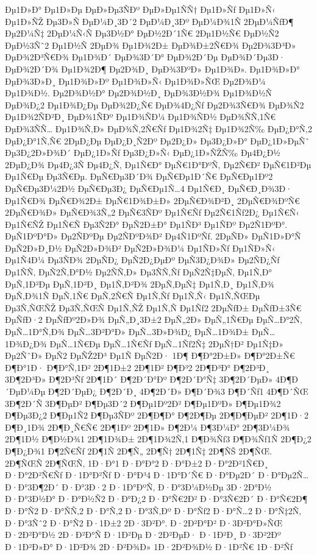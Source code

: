 {Ðµ1Ð»Ð°
Ðµ1Ð»Ðµ
ÐµÐ»Ðµ3ÑÐº
ÐµÐ»Ðµ1ÑÑ†
Ðµ1Ð»Ñƒ
Ðµ1Ð»Ñ‹
Ðµ1Ð»ÑŽ
Ðµ3Ð»Ñ
ÐµÐ¼Ð¸3Ð´2
ÐµÐ¼Ð¸3Ðº
ÐµÐ¼Ð¾1Ñ
2ÐµÐ¼ÑƒÐ¶
Ðµ2Ð¼Ñ‡
2ÐµÐ¼Ñ‹Ñ
Ðµ3Ð½Ð°
ÐµÐ½2Ð´1Ñ€
2Ðµ1Ð½Ñ€
ÐµÐ½Ñ2
ÐµÐ½3Ñˆ2
Ðµ1Ð½Ñ
2ÐµÐ¾
Ðµ1Ð¾2Ð±
ÐµÐ¾Ð±2Ñ€Ð¾
Ðµ2Ð¾3Ð³Ð»
ÐµÐ¾2Ð³Ñ€Ð¾
Ðµ1Ð¾Ð´
ÐµÐ¾3Ð´Ð°
ÐµÐ¾2Ð´Ðµ
ÐµÐ¾Ð´Ðµ3Ð·
ÐµÐ¾2Ð´Ð¾
Ðµ1Ð¾2Ð¶
Ðµ2Ð¾Ð¸
ÐµÐ¾3ÐºÐ»
Ðµ1Ð¾Ð».
Ðµ1Ð¾Ð»Ð°
ÐµÐ¾3Ð»Ð¸
Ðµ1Ð¾Ð»Ðº
Ðµ1Ð¾Ð»Ñ‹
Ðµ1Ð¾Ð»ÑŒ
Ðµ2Ð¾Ð¼
Ðµ1Ð¾Ð½.
Ðµ2Ð¾Ð½Ð°
Ðµ2Ð¾Ð½Ð¸
ÐµÐ¾3Ð½Ð¾
Ðµ1Ð¾Ð½Ñ
ÐµÐ¾Ð¿2
Ðµ1Ð¾Ð¿Ðµ
ÐµÐ¾2Ð¿Ñ€
ÐµÐ¾4Ð¿Ñƒ
Ðµ2Ð¾3Ñ€Ð¾
ÐµÐ¾Ñ2
Ðµ1Ð¾2ÑÐ²Ð¸
ÐµÐ¾1ÑÐº
Ðµ1Ð¾ÑÐ¼
Ðµ1Ð¾ÑÐ½
ÐµÐ¾ÑÑ‚1Ñ€
ÐµÐ¾3ÑÑ…
Ðµ1Ð¾Ñ‚Ð»
ÐµÐ¾Ñ‚2Ñ€Ñƒ
Ðµ1Ð¾2Ñ‡
Ðµ1Ð¾2Ñ‰
ÐµÐ¿Ð°Ñ‚2
ÐµÐ¿Ð°1Ñ‚Ñ€
2ÐµÐ¿Ðµ
ÐµÐ¿Ð¸Ñ2Ðº
Ðµ2Ð¿Ð»
Ðµ3Ð¿Ð»Ð°
ÐµÐ¿1Ð»ÐµÑˆ
Ðµ3Ð¿2Ð»Ð¾Ð´
ÐµÐ¿1Ð»Ñƒ
Ðµ3Ð¿Ð»Ñ‹
ÐµÐ¿1Ð»ÑŽÑ‰
Ðµ4Ð¿Ð½
2ÐµÐ¿Ð¾
Ðµ4Ð¿3Ñ
Ðµ4Ð¿Ñ‚
Ðµ1Ñ€Ð°
ÐµÑ€1Ð°ÐºÑ‚
Ðµ2Ñ€Ð²
ÐµÑ€1Ð²Ðµ
Ðµ1Ñ€Ðµ
Ðµ3Ñ€Ðµ.
ÐµÑ€Ðµ3Ð´Ð¾
ÐµÑ€Ðµ1Ð´Ñ€
ÐµÑ€Ðµ1Ðº2
ÐµÑ€Ðµ3Ð¼2Ð½
ÐµÑ€Ðµ3Ð¿
ÐµÑ€Ðµ1Ñ…4
Ðµ1Ñ€Ð¸
ÐµÑ€Ð¸Ð¾3Ð·
Ðµ1Ñ€Ð¾
ÐµÑ€Ð¾2Ð±
ÐµÑ€1Ð¾Ð±Ð»
2ÐµÑ€Ð¾Ð²Ð¸
2ÐµÑ€Ð¾ÐºÑ€
2ÐµÑ€Ð¾Ð»
ÐµÑ€Ð¾3Ñ„2
ÐµÑ€3ÑÐº
Ðµ1Ñ€Ñƒ
Ðµ2Ñ€1Ñƒ2Ð¿
Ðµ1Ñ€Ñ‹
Ðµ1Ñ€ÑŽ
Ðµ1Ñ€Ñ
Ðµ3Ñ2Ð°
ÐµÑ2Ð±Ð°
Ðµ1ÑÐ³
Ðµ1ÑÐº
Ðµ2Ñ1ÐºÐ°.
ÐµÑ1ÐºÐ°Ð»
Ðµ2ÑÐºÐµ
Ðµ2ÑÐºÐ¾Ð²
Ðµ4Ñ1ÐºÑƒ.
2ÐµÑÐ»
ÐµÑ1Ð»Ð°Ñ
ÐµÑ2Ð»Ð¸Ð½
ÐµÑ2Ð»Ð¾Ð²
ÐµÑ2Ð»Ð¾Ð¼
Ðµ1ÑÐ»Ñƒ
Ðµ1ÑÐ»Ñ‹
Ðµ1Ñ4Ð¼
Ðµ3ÑÐ¾
2ÐµÑÐ¿
ÐµÑ2Ð¿ÐµÐº
ÐµÑ3Ð¿Ð¾Ð»
Ðµ2ÑÐ¿Ñƒ
Ðµ1ÑÑ‚
ÐµÑ2Ñ‚Ð°Ð½
Ðµ2ÑÑ‚Ð»
Ðµ3ÑÑ‚Ñƒ
ÐµÑ2Ñ‡ÐµÑ‚
Ðµ1Ñ‚Ð°
ÐµÑ‚1Ð²Ðµ
ÐµÑ‚1Ð²Ð¸
Ðµ1Ñ‚Ð²Ð¾
2ÐµÑ‚ÐµÑ‡
Ðµ1Ñ‚Ð¸
Ðµ1Ñ‚Ð¾
ÐµÑ‚Ð¾1Ñ
ÐµÑ‚1Ñ€
ÐµÑ‚2Ñ€Ñ
Ðµ1Ñ‚Ñƒ
Ðµ1Ñ‚Ñ‹
Ðµ1Ñ‚ÑŒÐµ
Ðµ3Ñ‚ÑŒÑŽ
Ðµ3Ñ‚ÑŒÑ
Ðµ1Ñ‚ÑŽ
Ðµ1Ñ‚Ñ
Ðµ1Ñƒ2
2ÐµÑƒÐ±
ÐµÑƒÐ±3Ñ€
ÐµÑƒÐ·2
ÐµÑƒÐº2Ð»Ð¾
ÐµÑ„Ð¸3Ð±2
ÐµÑ„2Ð»
ÐµÑ„1Ñ€Ðµ
ÐµÑ…Ð°2Ñ‚
ÐµÑ…1Ð°Ñ‚Ð¾
ÐµÑ…3Ð²Ð°Ð»
ÐµÑ…3Ð»Ð¾Ð¿
ÐµÑ…1Ð¾Ð±
ÐµÑ…1Ð¾Ð¿Ð¾
ÐµÑ…1Ñ€Ðµ
ÐµÑ…1Ñ€Ñƒ
ÐµÑ…1Ñƒ2Ñ‡
2ÐµÑ†Ð²
Ðµ1Ñ‡Ð»
Ðµ2ÑˆÐ»
ÐµÑ2
ÐµÑŽ2Ð³
Ðµ1Ñ
ÐµÑ2Ð·
1Ð¶
Ð¶Ð°2Ð±Ð»
Ð¶Ð°2Ð±Ñ€
Ð¶Ð°1Ð·
Ð¶Ð°Ñ‚1Ð²
2Ð¶1Ð±2
2Ð¶1Ð²
Ð¶Ð³2
2Ð¶Ð³Ð°
Ð¶2Ð³Ð¸
3Ð¶2Ð³Ð»
Ð¶2Ð³Ñƒ
2Ð¶1Ð´
Ð¶2Ð´Ð°Ðº
Ð¶2Ð´Ð°Ñ‡
3Ð¶2Ð´ÐµÐ»
4Ð¶Ð´ÐµÐ¼Ðµ
Ð¶2Ð´ÐµÐ¿
Ð¶2Ð´Ð¸
4Ð¶2Ð´Ð»
Ð¶Ð´Ð¾3
Ð¶Ð´Ñƒ1
4Ð¶Ð´ÑŒ
3Ð¶2Ð´Ñ
3Ð¶ÐµÐ²
Ð¶Ðµ3Ð´2
Ð¶Ðµ1Ðº2Ð²
Ð¶Ðµ1ÐºÐ»
Ð¶Ðµ1Ð¾2
Ð¶Ðµ3Ð¿2
Ð¶Ðµ1Ñ2
Ð¶Ðµ3ÑÐº
2Ð¶Ð¶Ð°
Ð¶2Ð¶Ðµ
2Ð¶Ð¶ÐµÐ²
2Ð¶1Ð·2
Ð¶Ð¸1Ð¾
2Ð¶Ð¸Ñ€Ñ€
2Ð¶1Ðº
2Ð¶1Ð»
Ð¶2Ð¼
Ð¶3Ð¼Ð°
2Ð¶3Ð¼Ð¾
2Ð¶1Ð½
Ð¶Ð½Ð¾1
2Ð¶1Ð¾Ð±
2Ð¶1Ð¾2Ñ‚1
Ð¶Ð¾Ñƒ3
Ð¶Ð¾Ñƒ1Ñ
2Ð¶Ð¿2
Ð¶Ð¿Ð¾1
Ð¶2Ñ€Ñƒ
2Ð¶1Ñ
2Ð¶Ñ„
2Ð¶Ñ†
2Ð¶1Ñ‡
2Ð¶ÑŠ
2Ð¶ÑŒ.
2Ð¶ÑŒÑ
2Ð¶ÑŒÑ‚
1Ð·Ð°1
Ð·Ð°Ð°2
Ð·Ð°Ð±2
Ð·Ð°2Ð²1Ñ€Ð¸
Ð·Ð°2Ð²Ñ€Ñƒ
Ð·1Ð°Ð²Ñƒ
Ð·Ð°Ð³4
Ð·1Ð°Ð´Ñ€
Ð·Ð°Ðµ2Ð´
Ð·Ð°Ðµ2Ñ…
Ð·Ð°3Ð¶2Ð´
Ð·Ð°3Ð·2
Ð·1Ð°ÐºÑ‚
Ð·Ð°3Ð¼Ð½Ðµ
3Ð·2Ð°Ð½
Ð·Ð°3Ð½Ð°
Ð·Ð°Ð½Ñ2
Ð·Ð°Ð¿2
Ð·Ð°Ñ€2Ð²
Ð·Ð°3Ñ€2Ð´
Ð·Ð°Ñ€2Ð¶
Ð·Ð°Ñ2
Ð·Ð°ÑÑ‚2
Ð·Ð°Ñ‚2
Ð·Ð°3Ñ‚Ðº
Ð·Ð°Ñƒ2
Ð·Ð°Ñ…2
Ð·Ð°Ñ‡2Ñ‚
Ð·Ð°3Ñˆ2
Ð·Ð°Ñ2
Ð·1Ð±2
2Ð·3Ð²Ð°.
Ð·2Ð²Ð°Ð²
Ð·3Ð²Ð°Ð»ÑŒ
Ð·2Ð²Ð°Ð½
2Ð·Ð²Ð°Ñ
Ð·1Ð²Ðµ
Ð·2Ð²ÐµÐ·
Ð·1Ð²Ð¸
Ð·3Ð²2Ðº
Ð·1Ð²Ð»Ð°
Ð·1Ð²Ð¾
2Ð·Ð²Ð¾Ð»
1Ð·2Ð²Ð¾Ð½
Ð·1Ð²Ñ€
1Ð·Ð²Ñƒ
}
